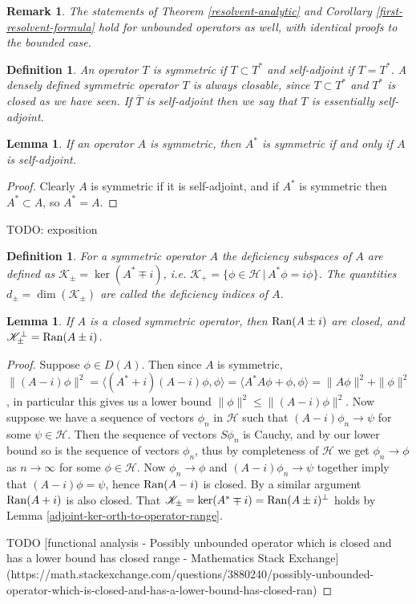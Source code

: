 \documentclass[12pt,oneside]{report}
\newtheorem{lem}[thm]{Lemma}
\newtheorem{defn}[thm]{Definition}
\newtheorem{rem}[thm]{Remark}
\begin{document}
\begin{rem}
    The statements of Theorem \ref{resolvent-analytic} and Corollary \ref{first-resolvent-formula} hold for unbounded operators as well, with identical proofs to the bounded case.
\end{rem}

\begin{defn}
    An operator $T$ is symmetric if $T \subset T^{*}$ and self-adjoint if $T = T^{*}$. A densely defined symmetric operator $T$ is always closable, since $T \subset T^{*}$ and $T^{*}$ is closed as we have seen. If $\overline{T}$ is self-adjoint then we say that $T$ is essentially self-adjoint.
\end{defn}

\begin{lem}
    If an operator $A$ is symmetric, then $A^{*}$ is symmetric if and only if $A$ is self-adjoint.
\end{lem}
\begin{proof}
    Clearly $A$ is symmetric if it is self-adjoint, and if $A^{*}$ is symmetric then $A^{*} \subset A$, so $A^{*} = A$.
\end{proof}

TODO: exposition

\begin{defn}
    For a symmetric operator $A$ the deficiency subspaces of $A$ are defined as $\mathscr{K}_{\pm} = \ker(A^{*}\mp i)$, i.e. $\mathscr{K}_{+} = \{ \phi \in \mathscr{H} \, | \, A^{*}\phi = i \phi \}$. The quantities $d_{\pm} = \dim(\mathscr{K}_{\pm})$ are called the deficiency indices of $A$.
\end{defn}

\begin{lem}
    If $A$ is a closed symmetric operator, then $\mathrm{Ran}(A\pm i)$ are closed, and $\mathscr{K}_{\pm}^{\perp} = \mathrm{Ran}(A\pm i)$.
\end{lem}
\begin{proof}
    Suppose $\phi \in D(A)$. Then since $A$ is symmetric, $\|(A - i)\phi\|^{2} = \langle (A^{*}+i)(A-i)\phi,\phi \rangle = \langle A^{*}A\phi + \phi, \phi \rangle = \|A\phi\|^{2} + \|\phi\|^{2}$, in particular this gives us a lower bound $\|\phi\|^{2} \leq \|(A-i)\phi\|^{2}$. Now suppose we have a sequence of vectors $\phi_{n}$ in $\mathscr{H}$ such that $(A-i)\phi_{n} \to \psi$ for some $\psi \in \mathscr{H}$. Then the sequence of vectors $S\phi_{n}$ is Cauchy, and by our lower bound so is the sequence of vectors $\phi_{n}$, thus by completeness of $\mathscr{H}$ we get $\phi_{n} \to \phi$ as $n \to \infty$ for some $\phi \in \mathscr{H}$. Now $\phi_{n} \to \phi$ and $(A-i)\phi_{n} \to \psi$ together imply that $(A-i)\phi = \psi$, hence $\mathrm{Ran}(A-i)$ is closed. By a similar argument $\mathrm{Ran}(A+i)$ is also closed. That $\mathscr{K}_{\pm} = \ker(A^{*}\mp i) = \mathrm{Ran}(A \pm i)^{\perp}$ holds by Lemma \ref{adjoint-ker-orth-to-operator-range}.
    
    TODO [functional analysis - Possibly unbounded operator which is closed and has a lower bound has closed range - Mathematics Stack Exchange](https://math.stackexchange.com/questions/3880240/possibly-unbounded-operator-which-is-closed-and-has-a-lower-bound-has-closed-ran)
\end{proof}
\end{document}
